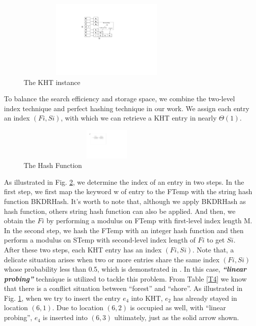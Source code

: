 \begin{figure}
\centering
\includegraphics[width=3.5in,height=1.5in]{KHT}
\caption{The KHT instance} \label{F1}
\end{figure}

To balance the search efficiency and storage space, we combine the two-level index technique and perfect hashing technique \cite{cormen2001introduction} in our work. We assign each entry an index $(Fi,Si)$, with which we can retrieve a KHT entry in nearly $\Theta(1)$.

\begin{figure}
\centering
\includegraphics[width=3.5in,height=0.6in]{HASH}
\caption{The Hash Function} \label{F20}
\end{figure}

As illustrated in Fig. \ref{F20}, we determine the index of an entry in two steps. In the first step, we first map the keyword w of entry to the FTemp with the string hash function BKDRHash. It's worth to note that, although we apply BKDRHash as hash function, others string hash function can also be applied. And then, we obtain the $Fi$ by performing a modulus on FTemp with first-level index length M. In the second step, we hash the FTemp with an integer hash function and then perform a modulus on STemp with second-level index length of $Fi$ to get $Si$. After these two steps, each KHT entry has an index $(Fi,Si)$. Note that, a delicate situation arises when two or more entries share the same index $(Fi,Si)$ whose probability less than 0.5, which is demonstrated in \cite{cormen2001introduction}. In this case, \textbf{\textit{``linear probing''}} technique is utilized to tackle this problem. From Table \ref{T4} we know that there is a conflict situation between ``forest'' and ``shore''. As illustrated in Fig. \ref{F1}, when we try to insert the entry $e_4$ into KHT, $e_2$ has already stayed in location $(6,1)$. Due to location $(6,2)$ is occupied as well, with ``linear probing'', $e_4$ is inserted into $(6,3)$ ultimately, just as the solid arrow shown.

